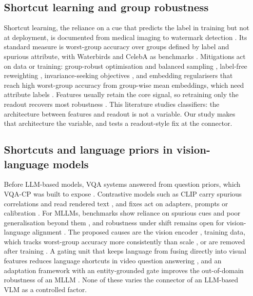 \subsection{Shortcut learning and group robustness}

Shortcut learning, the reliance on a cue that predicts the label in training but not at deployment, is documented
from medical imaging to watermark detection \citep{geirhos2020shortcut,degrave2021covid,lapuschkin2019clever}. Its
standard measure is worst-group accuracy over groups defined by label and spurious attribute, with Waterbirds and
CelebA as benchmarks \citep{sagawa2020groupdro,liu2015celeba}. Mitigations act on data or training: group-robust
optimisation and balanced sampling \citep{sagawa2020groupdro,idrissi2022balancing}, label-free reweighting
\citep{nam2020lff,liu2021jtt,qiu2023afr}, invariance-seeking objectives \citep{huang2024losingtickets,mitchell2026wule}, and
embedding regularisers that reach high worst-group accuracy from group-wise mean embeddings, which need attribute labels \citep{park2026scer}. Features usually retain the core signal, so retraining only the readout recovers most robustness
\citep{izmailov2022feature,kirichenko2023dfr}. This literature studies classifiers: the architecture between features and
readout is not a variable. Our study makes that architecture the variable, and tests a readout-style fix at the
connector.

\subsection{Shortcuts and language priors in vision-language models}

Before LLM-based models, VQA systems answered from question priors, which VQA-CP was built to expose
\citep{agrawal2018vqacp,goyal2019vqav2}. Contrastive models such as CLIP carry spurious correlations and read rendered
text \citep{radford2021clip,materzynska2022disentangling}, and fixes act on adapters, prompts or calibration
\citep{zhang2022adapters,chuang2023biasedprompts,you2024calibrating}. For MLLMs, benchmarks show reliance on spurious cues
and poor generalisation beyond them \citep{hosseini2025spurlens,yang2025spuriverse,ye2026mmspubench,zhang2024oodmllm},
and robustness under shift remains open for vision-language alignment \citep{zhu2024vlalignood}. The proposed causes are the
vision encoder \citep{tong2024eyes}, training data, which tracks worst-group accuracy more consistently than scale \citep{sarridis2026scaling}, or are removed after training
\citep{sarker2026purge}. A gating unit that keeps language from fusing directly into visual features reduces language
shortcuts in video question answering \citep{zou2024videodistill}, and an adaptation framework with an entity-grounded gate
improves the out-of-domain robustness of an MLLM \citep{ahn2026evident}. None of these varies the connector of an LLM-based VLM as a
controlled factor.

